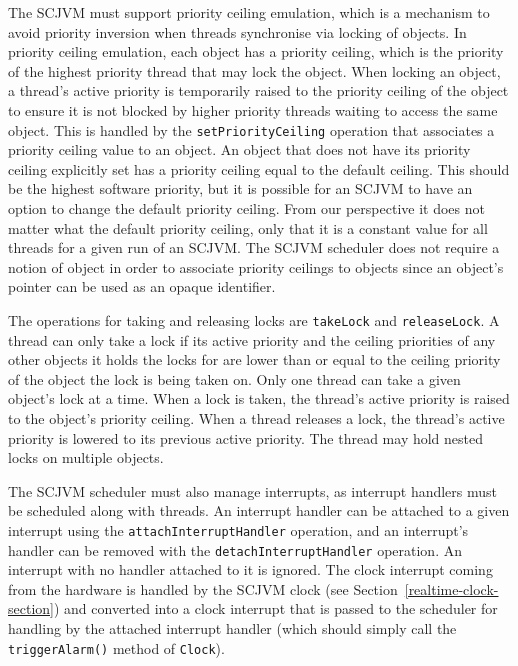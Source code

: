 The SCJVM must support priority ceiling emulation, which is a
mechanism to avoid priority inversion when threads synchronise via
locking of objects.
In priority ceiling emulation, each object has a priority ceiling,
which is the priority of the highest priority thread that may lock the
object.
When locking an object, a thread's active priority is temporarily
raised to the priority ceiling of the object to ensure it is not
blocked by higher priority threads waiting to access the same object.
This is handled by the \texttt{set\-Priority\-Ceiling} operation that
associates a priority ceiling value to an object.
An object that does not have its priority ceiling explicitly set has a
priority ceiling equal to the default ceiling.
This should be the highest software priority, but it is possible for
an SCJVM to have an option to change the default priority ceiling.
From our perspective it does not matter what the default priority
ceiling, only that it is a constant value for all threads for a given
run of an SCJVM.
The SCJVM scheduler does not require a notion of object in order to
associate priority ceilings to objects since an object's pointer can
be used as an opaque identifier.

The operations for taking and releasing locks are \texttt{takeLock}
and \texttt{releaseLock}.
A thread can only take a lock if its active priority and the ceiling
priorities of any other objects it holds the locks for are lower than
or equal to the ceiling priority of the object the lock is being taken
on.
Only one thread can take a given object's lock at a time.
When a lock is taken, the thread's active priority is raised to the
object's priority ceiling.
When a thread releases a lock, the thread's active priority is lowered
to its previous active priority.
The thread may hold nested locks on multiple objects.

The SCJVM scheduler must also manage interrupts, as interrupt handlers
must be scheduled along with threads.
An interrupt handler can be attached to a given interrupt using the
\texttt{attach\-Interrupt\-Handler} operation, and an interrupt's
handler can be removed with the \texttt{detach\-Interrupt\-Handler}
operation.
An interrupt with no handler attached to it is ignored.
The clock interrupt coming from the hardware is handled by the SCJVM
clock (see Section~\ref{realtime-clock-section}) and converted into a
clock interrupt that is passed to the scheduler for handling by the
attached interrupt handler (which should simply call the
\texttt{triggerAlarm()} method of \texttt{Clock}).

